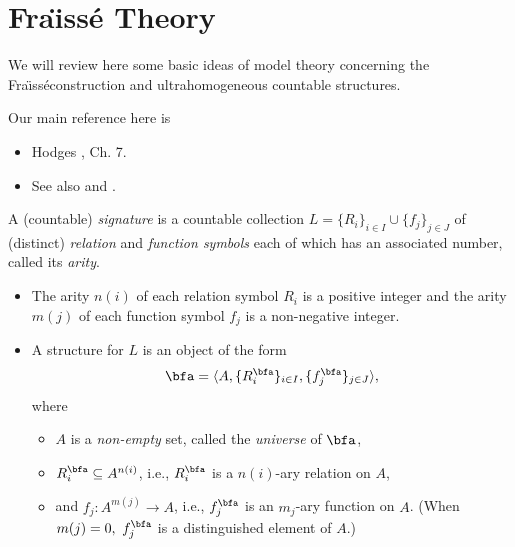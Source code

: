 \chapter{Fra\"{\i}ss\'{e} Theory}

We will review here some basic ideas of model theory concerning the Fra\"{\i}ss\'{e}construction and ultrahomogeneous countable structures.  

Our main reference
here is
\begin{itemize}
    \item Hodges \cite{H}, Ch. 7.
    \item See also \cite{Ch} and \cite{Ca}.
\end{itemize}



\begin{definition}
    A (countable) {\it signature} is a countable collection $L=\{R_i\}_{i\in I}  \cup\{f_j\}_{j\in J}$ of (distinct) {\it relation} and {\it function symbols}  each of which has an associated number, called its {\it arity}.

    \begin{itemize}
        \item The arity $n(i)$ of each relation symbol $R_i$ is a positive integer and the arity $m(j)$ of each function symbol $f_j$ is a non-negative integer.
        \item A structure
              for $L$ is an object of the form
              \[
                  \bfa=\langle A,\{R^\bfa_i\}_{i\in I},\{f^\bfa_j\}_{j\in J}\rangle ,
              \]
              where
              \begin{itemize}
                  \item $A$ is a {\it non-empty} set, called the {\it universe} of $\bfa$,
                  \item $R^\bfa_i\subseteq A^{n(i)}$, i.e., $R^\bfa_i$ is a $n(i)$-ary relation on $A$,
                  \item and $f_j:A^{m(j)}\rightarrow A$, i.e., $f_j^{\bfa}$ is an $m_j$-ary function on $A$. (When $m(j)=0,\ f_j^{\bfa}$ is a distinguished element of $A$.)
              \end{itemize}


    \end{itemize}


\end{definition}


